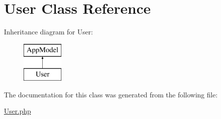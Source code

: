 \hypertarget{classUser}{
\section{\-User \-Class \-Reference}
\label{classUser}
}
\-Inheritance diagram for \-User\-:\begin{figure}[H]
\begin{center}
\leavevmode
\includegraphics[height=2.000000cm]{classUser}
\end{center}
\end{figure}


\-The documentation for this class was generated from the following file\-:\begin{DoxyCompactItemize}
\item 
\hyperlink{User_8php}{\-User.\-php}\end{DoxyCompactItemize}
